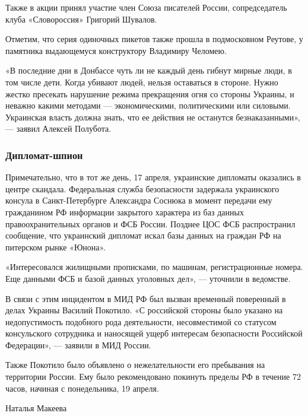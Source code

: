 Также в акции принял участие член Союза писателей России, сопредседатель клуба «Словороссия» Григорий Шувалов.

Отметим, что серия одиночных пикетов также прошла в подмосковном Реутове, у
памятника выдающемуся конструктору Владимиру Челомею.

«В последние дни в Донбассе чуть ли не каждый день гибнут мирные люди, в том
числе дети. Когда убивают людей, нельзя оставаться в стороне. Нужно жестко
пресекать нарушение режима прекращения огня со стороны Украины, и неважно
какими методами — экономическими, политическими или силовыми. Украинская власть
должна знать, что ее действия не останутся безнаказанными», — заявил Алексей
Полубота.

\subsubsection{Дипломат-шпион}

Примечательно, что в тот же день, 17 апреля, украинские дипломаты оказались в
центре скандала. Федеральная служба безопасности задержала украинского консула
в Санкт-Петербурге Александра Соснюка в момент передачи ему гражданином РФ
информации закрытого характера из баз данных правоохранительных органов и ФСБ
России. Позднее ЦОС ФСБ распространил сообщение, что украинский дипломат искал
базы данных на граждан РФ на питерском рынке «Юнона».

«Интересовался жилищными прописками, по машинам, регистрационные номера. Еще
данными ФСБ и базой данных уголовных дел», — уточнили в ведомстве.

В связи с этим инцидентом в МИД РФ был вызван временный поверенный в делах
Украины Василий Покотило.  «С российской стороны было указано на недопустимость
подобного рода деятельности, несовместимой со статусом консульского сотрудника
и наносящей ущерб интересам безопасности Российской Федерации», — заявили в МИД
России.

Также Покотило было объявлено о нежелательности его пребывания на территории
России. Ему было рекомендовано покинуть пределы РФ в течение 72 часов, начиная
с понедельника, 19 апреля.

Наталья Макеева
